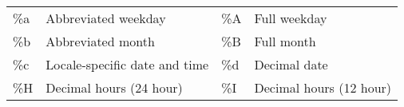 \documentclass[
  11pt,
]{krantz}
\begin{document}
\begin{table}
\begin{tabular}{llll}
\begin{minipage}[t]{0.05\columnwidth}\raggedright
\%a\strut
\end{minipage} & \begin{minipage}[t]{0.31\columnwidth}\raggedright
Abbreviated weekday\strut
\end{minipage} & \begin{minipage}[t]{0.05\columnwidth}\raggedright
\%A\strut
\end{minipage} & \begin{minipage}[t]{0.47\columnwidth}\raggedright
Full weekday\strut
\end{minipage}\tabularnewline
\begin{minipage}[t]{0.05\columnwidth}\raggedright
\%b\strut
\end{minipage} & \begin{minipage}[t]{0.31\columnwidth}\raggedright
Abbreviated month\strut
\end{minipage} & \begin{minipage}[t]{0.05\columnwidth}\raggedright
\%B\strut
\end{minipage} & \begin{minipage}[t]{0.47\columnwidth}\raggedright
Full month\strut
\end{minipage}\tabularnewline
\begin{minipage}[t]{0.05\columnwidth}\raggedright
\%c\strut
\end{minipage} & \begin{minipage}[t]{0.31\columnwidth}\raggedright
Locale-specific date and time\strut
\end{minipage} & \begin{minipage}[t]{0.05\columnwidth}\raggedright
\%d\strut
\end{minipage} & \begin{minipage}[t]{0.47\columnwidth}\raggedright
Decimal date\strut
\end{minipage}\tabularnewline
\begin{minipage}[t]{0.05\columnwidth}\raggedright
\%H\strut
\end{minipage} & \begin{minipage}[t]{0.31\columnwidth}\raggedright
Decimal hours (24 hour)\strut
\end{minipage} & \begin{minipage}[t]{0.05\columnwidth}\raggedright
\%I\strut
\end{minipage} & \begin{minipage}[t]{0.47\columnwidth}\raggedright
Decimal hours (12 hour)\strut

\end{minipage}
\end{tabular}
\end{table}
\end{document}
